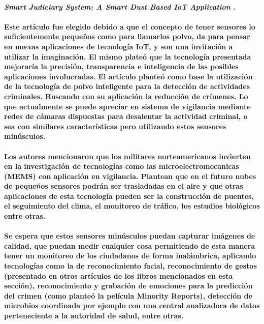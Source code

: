 \paragraph{
    \textbf{\emph{Smart Judiciary System: A Smart Dust
            Based IoT Application}
    }
    \cite[pág. 128]{somani_emerging_2019}.
}

\paragraph{
    Este artículo fue elegido debido a que el concepto de tener sensores lo suficientemente pequeños como para llamarlos polvo,
    da para pensar en nuevas aplicaciones de tecnología IoT, y son una invitación a utilizar la imaginación.
    El mismo plateó que la tecnología presentada mejoraría la precisión, transparencia e inteligencia de las posibles aplicaciones involucradas.
    El artículo planteó como base la utilización de la tecnología de polvo inteligente para la detección de actividades criminales.
    Buscando con su aplicación la reducción de crímenes. Lo que actualmente se puede apreciar en sistema de vigilancia mediante redes de cámaras dispuestas
    para desalentar la actividad criminal, o sea con similares características pero utilizando estos sensores minúsculos.
}

\paragraph{
    Los autores mencionaron que los militares norteamericanos invierten en la investigación de tecnologías como las microelectromecanicas (MEMS)
    con aplicación en vigilancia. Plantean que en el futuro nubes de pequeños sensores podrán ser trasladadas en el aire y que otras aplicaciones de esta tecnología pueden ser la construcción de puentes, el seguimiento del clima, el monitoreo de tráfico, los estudios biológicos entre otras.
}

\paragraph{
    Se espera que estos sensores minúsculos puedan capturar imágenes de calidad, que puedan medir cualquier cosa permitiendo de esta manera tener un monitoreo de los ciudadanos de forma inalámbrica, aplicando tecnologías como la de reconocimiento facial, reconocimiento de gestos (presentado en otros artículos de los libros mencionados en esta sección), reconocimiento y grabación de emociones para la predicción del crimen (como planteó la película Minority Reports), detección de microbios coordinada por ejemplo con una central analizadora de datos perteneciente a la autoridad de salud, entre otras.
}

